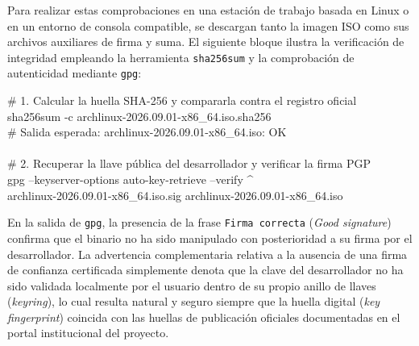 \documentclass[12pt]{article}
\begin{document}
Para realizar estas comprobaciones en una estación de trabajo basada en Linux o en un entorno de consola compatible, se descargan tanto la imagen ISO como sus archivos auxiliares de firma y suma. El siguiente bloque ilustra la verificación de integridad empleando la herramienta \texttt{sha256sum} y la comprobación de autenticidad mediante \texttt{gpg}:

\begin{mdframed}[style=terminal]
\ttfamily\upshape\color{bashLetterColor}\footnotesize
\# 1. Calcular la huella SHA-256 y compararla contra el registro oficial \\
sha256sum -c archlinux-2026.09.01-x86\_64.iso.sha256 \\
\# Salida esperada: archlinux-2026.09.01-x86\_64.iso: OK \\
\\
\# 2. Recuperar la llave pública del desarrollador y verificar la firma PGP \\
gpg --keyserver-options auto-key-retrieve --verify \string^ \\
\hspace*{4ex}archlinux-2026.09.01-x86\_64.iso.sig archlinux-2026.09.01-x86\_64.iso
\end{mdframed}

En la salida de \texttt{gpg}, la presencia de la frase \texttt{Firma correcta} (\textit{Good signature}) confirma que el binario no ha sido manipulado con posterioridad a su firma por el desarrollador. La advertencia complementaria relativa a la ausencia de una firma de confianza certificada simplemente denota que la clave del desarrollador no ha sido validada localmente por el usuario dentro de su propio anillo de llaves (\textit{keyring}), lo cual resulta natural y seguro siempre que la huella digital (\textit{key fingerprint}) coincida con las huellas de publicación oficiales documentadas en el portal institucional del proyecto.
\end{document}
